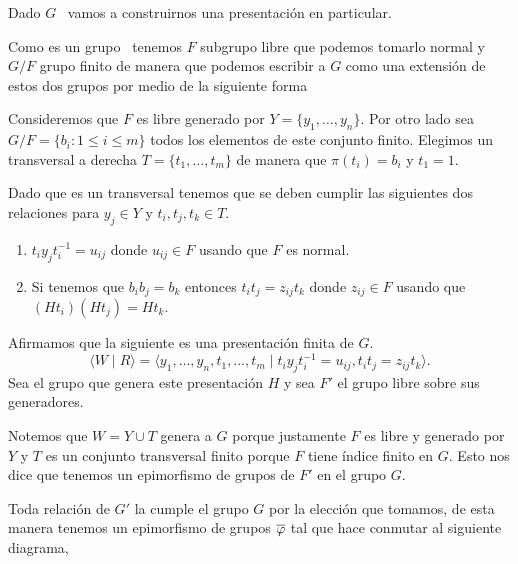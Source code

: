 \documentclass[tesis.tex]{subfiles}
\begin{document}
\begin{obs}\label{obs_presentacion_vl}
	Dado $G$ \vl \ vamos a construirnos una presentación en particular.
	
	Como es un grupo \vl \ tenemos $F$ subgrupo libre que podemos tomarlo normal y $G/F$ grupo finito de manera que podemos escribir a $G$ como una extensión de estos dos grupos por medio de la siguiente forma
	\begin{center}
	\end{center}
	
	Consideremos que $F$ es libre generado por $Y = \{ y_1, \dots, y_n \}$.
	Por otro lado sea $G/F = \{ b_i : 1 \le i \le m \}$ todos los elementos de este conjunto finito.
	Elegimos un transversal a derecha $T = \{ t_1, \dots, t_m \}$ de manera que $\pi(t_i)= b_i$ y $t_1 = 1$.
	
	Dado que es un transversal tenemos que se deben cumplir las siguientes dos relaciones para $y_j \in Y$ y $t_i,t_j,t_k \in T$. 
	\begin{enumerate}
		\item $t_iy_jt_i^{-1} = u_{ij}$ donde $u_{ij} \in F$ usando que $F$ es normal.
		\item Si tenemos que $b_ib_j = b_k$ entonces $t_it_j = z_{ij}t_k$ donde $z_{ij} \in F$ usando que $(Ht_i)(Ht_j) = Ht_k$.
	\end{enumerate}
	
	Afirmamos que la siguiente es una presentación finita de $G$.
	\[
	\langle W \mid R \rangle =  \langle y_1, \dots, y_n, t_1, \dots, t_m \mid t_iy_jt_i^{-1} = u_{ij},  t_it_j = z_{ij}t_k \rangle.
	\]
	Sea el grupo que genera este presentación $H$ y sea $F'$ el grupo libre sobre sus generadores.
	
	Notemos que $W =Y \cup T$ genera a $G$ porque justamente $F$ es libre y generado por $Y$ y $T$ es un conjunto transversal finito porque $F$ tiene índice finito en $G$.
	Esto nos dice que tenemos un epimorfismo de grupos de $F'$ en el grupo $G$.
	
	Toda relación de $G'$ la cumple el grupo $G$ por la elección que tomamos, de esta manera tenemos un epimorfismo de grupos $\overline \varphi$ tal que hace conmutar al siguiente diagrama,
	
	\begin{center}
	\end{center}
	

\end{obs}
\end{document}

